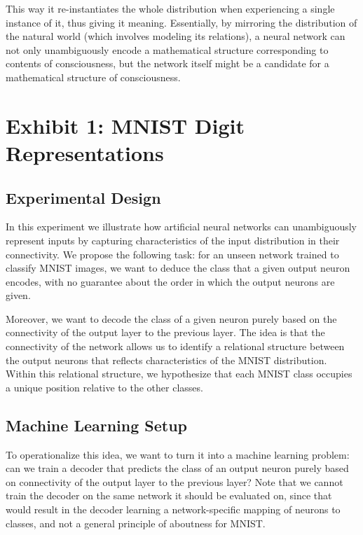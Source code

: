 \documentclass[11pt]{article}
\begin{document}
This way it re-instantiates the whole distribution when experiencing a single instance of it, thus giving it meaning. Essentially, by mirroring the distribution of the natural world (which involves modeling its relations), a neural network can not only unambiguously encode a mathematical structure corresponding to contents of consciousness, but the network itself might be a candidate for a mathematical structure of consciousness.

\section{Exhibit 1: MNIST Digit Representations}

\subsection{Experimental Design}

In this experiment we illustrate how artificial neural networks can unambiguously represent inputs by capturing characteristics of the input distribution in their connectivity. We propose the following task: for an unseen network trained to classify MNIST images, we want to deduce the class that a given output neuron encodes, with no guarantee about the order in which the output neurons are given.

Moreover, we want to decode the class of a given neuron purely based on the connectivity of the output layer to the previous layer. The idea is that the connectivity of the network allows us to identify a relational structure between the output neurons that reflects characteristics of the MNIST distribution. Within this relational structure, we hypothesize that each MNIST class occupies a unique position relative to the other classes.

\subsection{Machine Learning Setup}

To operationalize this idea, we want to turn it into a machine learning problem: can we train a decoder that predicts the class of an output neuron purely based on connectivity of the output layer to the previous layer? Note that we cannot train the decoder on the same network it should be evaluated on, since that would result in the decoder learning a network-specific mapping of neurons to classes, and not a general principle of aboutness for MNIST.
\end{document}
